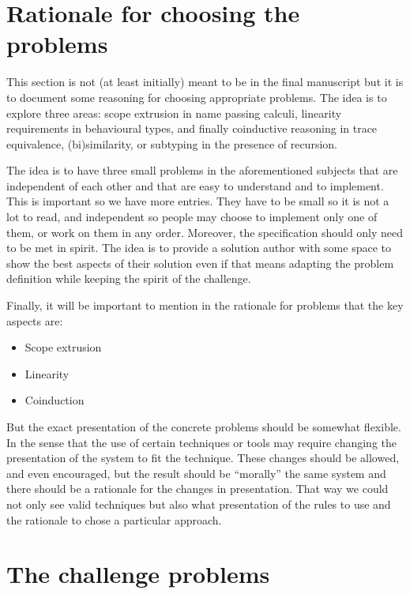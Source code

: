 \documentclass{article}
\begin{document}
\section{Rationale for choosing the problems}\label{sec:rationale}

This section is not (at least initially) meant to be in the final
manuscript but it is to document some reasoning for choosing
appropriate problems. The idea is to explore three areas: scope
extrusion in name passing calculi, linearity requirements in
behavioural types, and finally coinductive reasoning in trace
equivalence, (bi)similarity, or subtyping in the presence of
recursion.

The idea is to have three small problems in the aforementioned
subjects that are independent of each other and that are easy to
understand and to implement. This is important so we have more
entries. They have to be small so it is not a lot to read, and
independent so people may choose to implement only one of them, or
work on them in any order. Moreover, the specification should only
need to be met in spirit. The idea is to provide a solution author
with some space to show the best aspects of their solution even if
that means adapting the problem definition while keeping the spirit of
the challenge.

Finally, it will be important to mention in the rationale for problems that
the key aspects are:
\begin{itemize}
\item Scope extrusion
\item Linearity
\item Coinduction
\end{itemize}

But the exact presentation of the concrete problems should be somewhat
flexible. In the sense that the use of certain techniques or tools may
require changing the presentation of the system to fit the technique.
These changes should be allowed, and even encouraged, but the result
should be ``morally'' the same system and there should be a
rationale for the changes in presentation. That way we could not only
see valid techniques but also what presentation of the rules to use
and the rationale to chose a particular approach.

\section{The challenge problems} \label{sec:problems}
\end{document}
